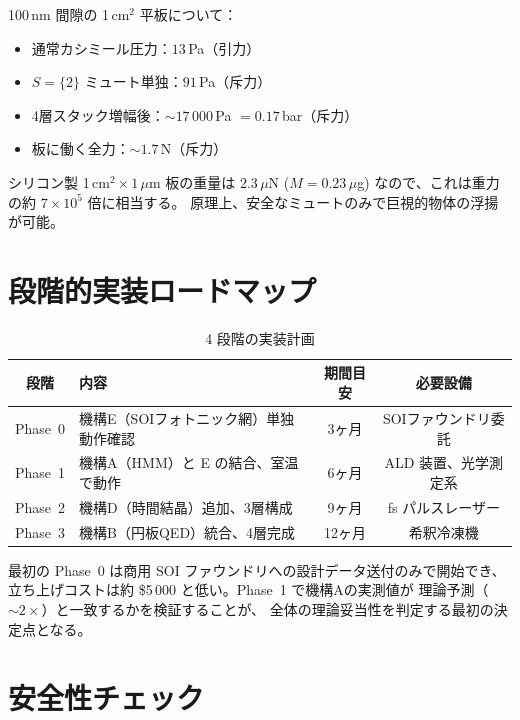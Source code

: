 \documentclass[11pt,a4paper]{article}
\begin{document}
100\,nm 間隙の 1\,cm$^2$ 平板について：

\begin{itemize}[leftmargin=2em]
  \item 通常カシミール圧力：$13$\,Pa（引力）
  \item $S=\{2\}$ ミュート単独：$91$\,Pa（斥力）
  \item 4層スタック増幅後：$\sim 17\,000$\,Pa $= 0.17$\,bar（斥力）
  \item 板に働く全力：$\sim 1.7$\,N（斥力）
\end{itemize}

シリコン製 1\,cm$^2 \times 1\,\mu$m 板の重量は $2.3\,\mu$N
($M = 0.23\,\mu$g) なので、これは重力の約 $7\times 10^{5}$ 倍に相当する。
原理上、安全なミュートのみで巨視的物体の浮揚が可能。

\section{段階的実装ロードマップ}

\begin{table}[h]
\centering
\caption{4 段階の実装計画}
\label{tab:roadmap}
\small
\begin{tabular}{clcc}
\toprule
段階 & 内容 & 期間目安 & 必要設備 \\
\midrule
Phase~0 & 機構E（SOIフォトニック網）単独動作確認 & 3ヶ月 & SOIファウンドリ委託 \\
Phase~1 & 機構A（HMM）と E の結合、室温で動作 & 6ヶ月 & ALD 装置、光学測定系 \\
Phase~2 & 機構D（時間結晶）追加、3層構成 & 9ヶ月 & fs パルスレーザー \\
Phase~3 & 機構B（円板QED）統合、4層完成 & 12ヶ月 & 希釈冷凍機 \\
\bottomrule
\end{tabular}
\end{table}

最初の Phase~0 は商用 SOI ファウンドリへの設計データ送付のみで開始でき、
立ち上げコストは約 \$5\,000 と低い。Phase~1 で機構Aの実測値が
理論予測（$\sim 2\times$）と一致するかを検証することが、
全体の理論妥当性を判定する最初の決定点となる。

\section{安全性チェック}
\end{document}
